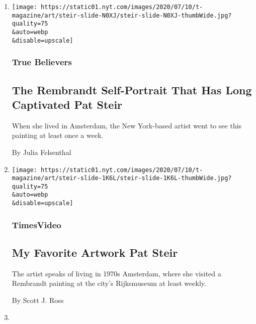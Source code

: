 \begin{enumerate}
\def\labelenumi{\arabic{enumi}.}
\item
  \href{/2020/07/21/t-magazine/pat-steir.html}{}

  \texttt{[image: https://static01.nyt.com/images/2020/07/10/t-magazine/art/steir-slide-N0XJ/steir-slide-N0XJ-thumbWide.jpg?quality=75\\\&auto=webp\\\&disable=upscale]}

  \hypertarget{true-believers-14}{%
  \subsubsection{True Believers}\label{true-believers-14}}

  \hypertarget{the-rembrandt-self-portrait-that-has-long-captivated-pat-steir}{%
  \subsection{The Rembrandt Self-Portrait That Has Long Captivated Pat
  Steir}\label{the-rembrandt-self-portrait-that-has-long-captivated-pat-steir}}

  When she lived in Amsterdam, the New York-based artist went to see
  this painting at least once a week.

  By Julia Felsenthal
\item
  \href{/video/t-magazine/art/100000007194871/my-favorite-artwork-pat-steir.html}{}

  \texttt{[image: https://static01.nyt.com/images/2020/07/10/t-magazine/art/steir-slide-1K6L/steir-slide-1K6L-thumbWide.jpg?quality=75\\\&auto=webp\\\&disable=upscale]}

  \hypertarget{timesvideo}{%
  \subsubsection{TimesVideo}\label{timesvideo}}

  \hypertarget{my-favorite-artwork--pat-steir}{%
  \subsection{My Favorite Artwork \textbar{} Pat
  Steir}\label{my-favorite-artwork--pat-steir}}

  The artist speaks of living in 1970s Amsterdam, where she visited a
  Rembrandt painting at the city's Rijksmuseum at least weekly.

  By Scott J. Ross
\item
  \href{/2020/07/20/t-magazine/ruth-asawa.html}{}


\end{enumerate}
